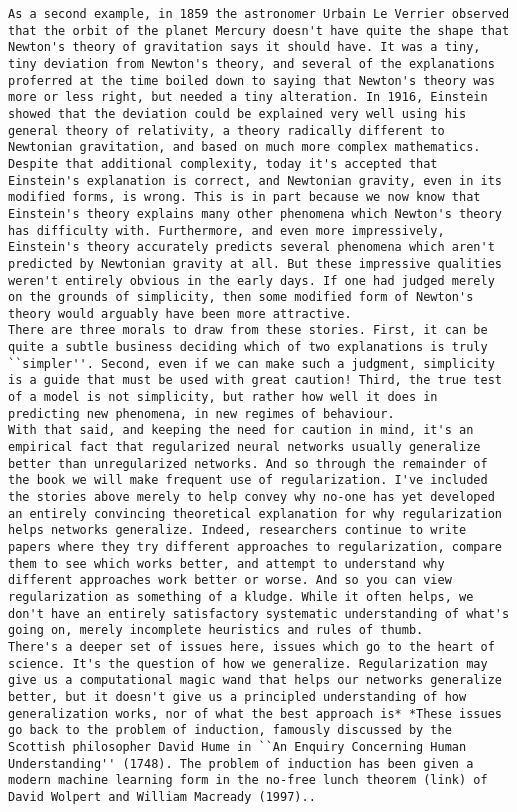 \begin{lstlisting}
As a second example, in 1859 the astronomer Urbain Le Verrier observed that the orbit of the planet Mercury doesn't have quite the shape that Newton's theory of gravitation says it should have. It was a tiny, tiny deviation from Newton's theory, and several of the explanations proferred at the time boiled down to saying that Newton's theory was more or less right, but needed a tiny alteration. In 1916, Einstein showed that the deviation could be explained very well using his general theory of relativity, a theory radically different to Newtonian gravitation, and based on much more complex mathematics. Despite that additional complexity, today it's accepted that Einstein's explanation is correct, and Newtonian gravity, even in its modified forms, is wrong. This is in part because we now know that Einstein's theory explains many other phenomena which Newton's theory has difficulty with. Furthermore, and even more impressively, Einstein's theory accurately predicts several phenomena which aren't predicted by Newtonian gravity at all. But these impressive qualities weren't entirely obvious in the early days. If one had judged merely on the grounds of simplicity, then some modified form of Newton's theory would arguably have been more attractive.
There are three morals to draw from these stories. First, it can be quite a subtle business deciding which of two explanations is truly ``simpler''. Second, even if we can make such a judgment, simplicity is a guide that must be used with great caution! Third, the true test of a model is not simplicity, but rather how well it does in predicting new phenomena, in new regimes of behaviour.
With that said, and keeping the need for caution in mind, it's an empirical fact that regularized neural networks usually generalize better than unregularized networks. And so through the remainder of the book we will make frequent use of regularization. I've included the stories above merely to help convey why no-one has yet developed an entirely convincing theoretical explanation for why regularization helps networks generalize. Indeed, researchers continue to write papers where they try different approaches to regularization, compare them to see which works better, and attempt to understand why different approaches work better or worse. And so you can view regularization as something of a kludge. While it often helps, we don't have an entirely satisfactory systematic understanding of what's going on, merely incomplete heuristics and rules of thumb.
There's a deeper set of issues here, issues which go to the heart of science. It's the question of how we generalize. Regularization may give us a computational magic wand that helps our networks generalize better, but it doesn't give us a principled understanding of how generalization works, nor of what the best approach is* *These issues go back to the problem of induction, famously discussed by the Scottish philosopher David Hume in ``An Enquiry Concerning Human Understanding'' (1748). The problem of induction has been given a modern machine learning form in the no-free lunch theorem (link) of David Wolpert and William Macready (1997)..

\end{lstlisting}
